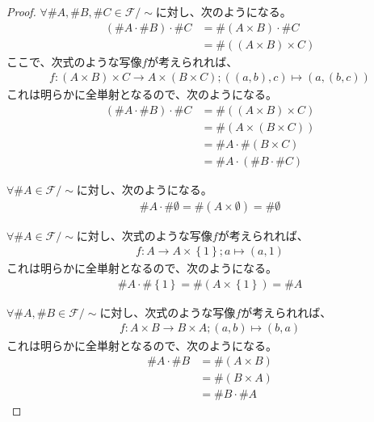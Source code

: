 \documentclass[dvipdfmx]{jsarticle}
\begin{document}
\begin{proof}
$\forall\# A,\# B,\# C \in \mathcal{F} /\sim $に対し、次のようになる。
\begin{align*}
\left( \# A \cdot \# B \right) \cdot \# C &= \# (A \times B) \cdot \# C\\
&= \# \left( (A \times B) \times C \right)
\end{align*}
ここで、次式のような写像$f$が考えられれば、
\begin{align*}
f:(A \times B) \times C \rightarrow A \times (B \times C);\left( (a,b),c \right) \mapsto \left( a,(b,c) \right)
\end{align*}
これは明らかに全単射となるので、次のようになる。
\begin{align*}
\left( \# A \cdot \# B \right) \cdot \# C &= \# \left( (A \times B) \times C \right)\\
&= \# \left( A \times (B \times C) \right)\\
&= \# A \cdot \# (B \times C)\\
&= \# A \cdot \left( \# B \cdot \# C \right)
\end{align*}\par
$\forall\# A \in \mathcal{F} /\sim $に対し、次のようになる。
\begin{align*}
\# A \cdot \# \emptyset  = \# (A \times \emptyset ) = \# \emptyset 
\end{align*}\par
$\forall\# A \in \mathcal{F} /\sim $に対し、次式のような写像$f$が考えられれば、
\begin{align*}
f:A \rightarrow A \times \left\{ 1 \right\};a \mapsto (a,1)
\end{align*}
これは明らかに全単射となるので、次のようになる。
\begin{align*}
\# A \cdot \# \left\{ 1 \right\} = \# \left( A \times \left\{ 1 \right\} \right) = \# A
\end{align*}\par
$\forall\# A,\# B \in \mathcal{F} /\sim $に対し、次式のような写像$f$が考えられれば、
\begin{align*}
f:A \times B \rightarrow B \times A;(a,b) \mapsto (b,a)
\end{align*}
これは明らかに全単射となるので、次のようになる。
\begin{align*}
\# A \cdot \# B &= \# (A \times B)\\
&= \# (B \times A)\\
&= \# B \cdot \# A
\end{align*}\par

\end{proof}
\end{document}
